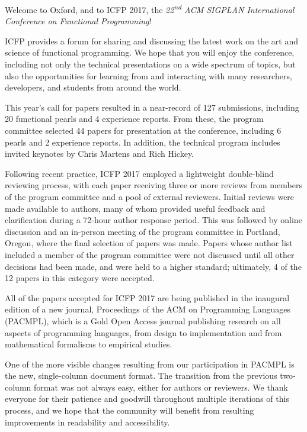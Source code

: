 \label{Preface}

\noindent
Welcome to Oxford, and to ICFP 2017, the \textit{22\textsuperscript{nd} ACM SIGPLAN International Conference on Functional Programming}!

ICFP provides a forum for sharing and discussing the latest work on the art and science of functional programming. We hope that you will enjoy the conference, including not only the technical presentations on a wide spectrum of topics, but also the opportunities for learning from and interacting with many researchers, developers, and students from around the world.

This year's call for papers resulted in a near-record of 127 submissions, including 20 functional pearls and 4 experience reports. From these, the program committee selected 44 papers for presentation at the conference, including 6 pearls and 2 experience reports. In addition, the technical program includes invited keynotes by Chris Martens and Rich Hickey.

Following recent practice, ICFP 2017 employed a lightweight double-blind reviewing process, with each paper receiving three or more reviews from members of the program committee and a pool of external reviewers. Initial reviews were made available to authors, many of whom provided useful feedback and clarification during a 72-hour author response period. This was followed by online discussion and an in-person meeting of the program committee in Portland, Oregon, where the final selection of papers was made. Papers whose author list included a member of the program committee were not discussed until all other decisions had been made, and were held to a higher standard; ultimately, 4 of the 12 papers in this category were accepted.

All of the papers accepted for ICFP 2017 are being published in the inaugural edition of a new journal, Proceedings of the ACM on Programming Languages (PACMPL), which is a Gold Open Access journal publishing research on all aspects of programming languages, from design to implementation and from mathematical formalisms to empirical studies. 

One of the more visible changes resulting from our participation in PACMPL is the new, single-column document format. The transition from the previous two-column format was not always easy, either for authors or reviewers. We thank everyone for their patience and goodwill throughout multiple iterations of this process, and we hope that the community will benefit from resulting improvements in readability and accessibility.


